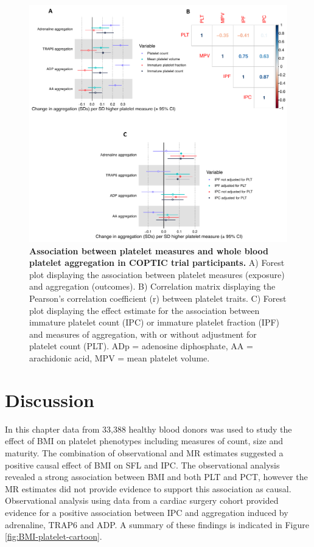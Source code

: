 \documentclass[11pt,twoside]{bristolthesis}
\begin{document}
\begin{figure}

{\centering \includegraphics[width=0.85\linewidth]{figure/BMI_platelets/IPC_aggregation} 

}

\caption[Association between platelet measures and whole blood platelet aggregation in COPTIC trial participants]{\textbf{Association between platelet measures and whole blood platelet aggregation in COPTIC trial participants.} A) Forest plot displaying the association between platelet measures (exposure) and aggregation (outcomes). B) Correlation matrix displaying the Pearson's correlation coefficient (r) between platelet traits. C) Forest plot displaying the effect estimate for the association between immature platelet count (IPC) or immature platelet fraction (IPF) and measures of aggregation, with or without adjustment for platelet count (PLT). ADp = adenosine diphosphate, AA = arachidonic acid, MPV = mean platelet volume.}\label{fig:IPC-aggregation}
\end{figure}
\hypertarget{discussion}{%
\section{Discussion}\label{discussion}}

In this chapter data from 33,388 healthy blood donors was used to study the effect of BMI on platelet phenotypes including measures of count, size and maturity. The combination of observational and MR estimates suggested a positive causal effect of BMI on SFL and IPC. The observational analysis revealed a strong association between BMI and both PLT and PCT, however the MR estimates did not provide evidence to support this association as causal. Observational analysis using data from a cardiac surgery cohort provided evidence for a positive association between IPC and aggregation induced by adrenaline, TRAP6 and ADP. A summary of these findings is indicated in Figure \ref{fig:BMI-platelet-cartoon}.
\end{document}
